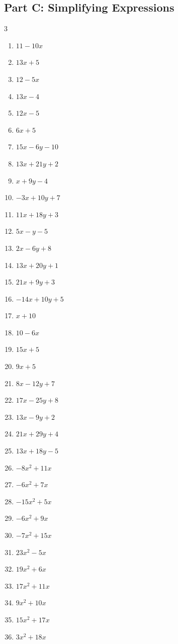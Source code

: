 \documentclass[11pt]{article}
\begin{document}
\subsection*{Part C: Simplifying Expressions}
\begin{multicols}{3}
\begin{enumerate}
  \item $11 - 10 x$
  \item $13 x + 5$
  \item $12 - 5 x$
  \item $13 x - 4$
  \item $12 x - 5$
  \item $6 x + 5$
  \item $15 x - 6 y - 10$
  \item $13 x + 21 y + 2$
  \item $x + 9 y - 4$
  \item $- 3 x + 10 y + 7$
  \item $11 x + 18 y + 3$
  \item $5 x - y - 5$
  \item $2 x - 6 y + 8$
  \item $13 x + 20 y + 1$
  \item $21 x + 9 y + 3$
  \item $- 14 x + 10 y + 5$
  \item $x + 10$
  \item $10 - 6 x$
  \item $15 x + 5$
  \item $9 x + 5$
  \item $8 x - 12 y + 7$
  \item $17 x - 25 y + 8$
  \item $13 x - 9 y + 2$
  \item $21 x + 29 y + 4$
  \item $13 x + 18 y - 5$
  \item $- 8 x^{2} + 11 x$
  \item $- 6 x^{2} + 7 x$
  \item $- 15 x^{2} + 5 x$
  \item $- 6 x^{2} + 9 x$
  \item $- 7 x^{2} + 15 x$
  \item $23 x^{2} - 5 x$
  \item $19 x^{2} + 6 x$
  \item $17 x^{2} + 11 x$
  \item $9 x^{2} + 10 x$
  \item $15 x^{2} + 17 x$
  \item $3 x^{2} + 18 x$

\end{enumerate}
\end{multicols}
\end{document}
